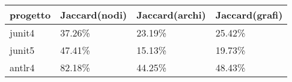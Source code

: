 \begin{center}
    \begin{tabular}{|l|l|l|l|}
        \hline
        progetto & Jaccard(nodi) & Jaccard(archi) & Jaccard(grafi) \\ \hline
        \hline
        \rowcolor[HTML]{ED8796} 
        junit4 & 37.26\% & 23.19\% & 25.42\% \\ \hline
        \rowcolor[HTML]{ED8796} 
        junit5 & 47.41\% & 15.13\% & 19.73\% \\ \hline
        \rowcolor[HTML]{EED49F} 
        antlr4 & 82.18\% & 44.25\% & 48.43\% \\ \hline
    \end{tabular}
\end{center}

